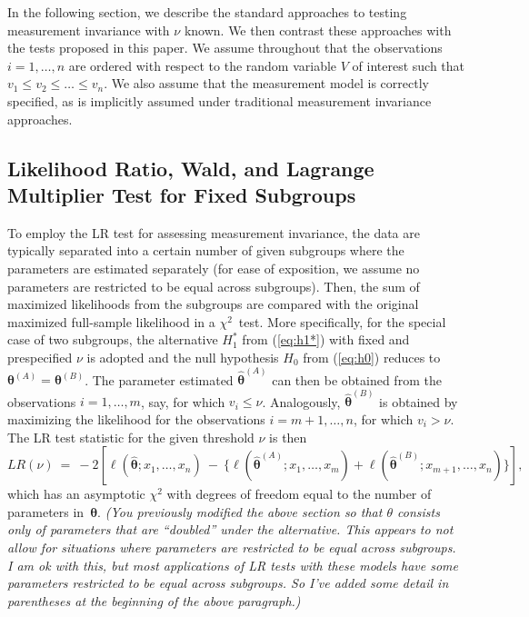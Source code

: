\documentclass[man]{apa}
\newcommand{\readme}[1]{\emph{\marginpar{README} (#1)}}
\begin{document}
In the following section, we describe the standard approaches to
testing measurement invariance with $\nu$ known.  We then contrast
these approaches with the tests proposed in this paper.
We assume throughout that the observations $i = 1, \dots, n$ are
ordered with respect to the random variable $V$ of interest such that
$v_1 \le v_2 \le \dots \le v_n$.  We also assume that the measurement
model is correctly specified, as is implicitly assumed under traditional
measurement invariance approaches.


\subsection{Likelihood Ratio, Wald, and Lagrange Multiplier Test for Fixed Subgroups}

To employ the LR test for assessing measurement invariance, the data
are typically separated into a certain number of given subgroups where
the parameters are estimated separately (for ease of
  exposition, we assume no parameters are restricted to be equal
  across subgroups). Then, the sum of maximized likelihoods 
from the subgroups are compared with the original maximized full-sample likelihood
in a $\chi^2$~test. More specifically, for the special case of two subgroups,
the alternative $H_1^*$ from (\ref{eq:h1*}) with fixed and prespecified $\nu$ is adopted
and the null hypothesis $H_0$ from (\ref{eq:h0}) reduces to ${\bm \theta}^{(A)} = {\bm \theta}^{(B)}$.
The parameter estimated $\hat {\bm \theta}^{(A)}$ can then be obtained from the
observations $i = 1, \dots, m$, say, for which $v_i \le \nu$. Analogously,
$\hat {\bm \theta}^{(B)}$ is obtained by maximizing the likelihood for the
observations $i = m + 1, \dots, n$, for which $v_i > \nu$. The LR test statistic
for the given threshold $\nu$ is then
\begin{equation} \label{eq:lr}
  \mathit{LR}(\nu) ~=~ -2 \left[
         \ell(\hat {\bm \theta}; x_1, \dots, x_n)
   ~-~ \{\ell(\hat {\bm \theta}^{(A)}; x_1, \dots, x_m)
    +    \ell(\hat {\bm \theta}^{(B)}; x_{m+1}, \dots, x_n)\}
    \right],
\end{equation}
which has an asymptotic $\chi^2$ with degrees of freedom equal to the number
of parameters in~${\bm \theta}$.
\readme{You previously modified the above section so that $\theta$
  consists only of parameters that are ``doubled'' under the
  alternative.  This appears to not allow for situations where
  parameters are restricted to be equal across subgroups.  I am ok
  with this, but most applications of LR tests with these models have
  some parameters restricted to be equal across subgroups.  So I've
  added some detail in parentheses at the beginning of the above
  paragraph.}
\end{document}
